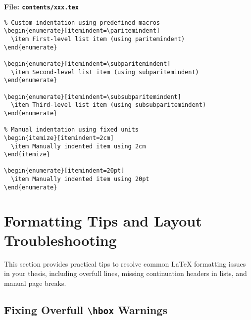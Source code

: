 \noindent\textbf{File: \texttt{contents/xxx.tex}}\vspace{-1em}
\begin{verbatim}
% Custom indentation using predefined macros
\begin{enumerate}[itemindent=\paritemindent]
  \item First-level list item (using paritemindent)
\end{enumerate}

\begin{enumerate}[itemindent=\subparitemindent]
  \item Second-level list item (using subparitemindent)
\end{enumerate}

\begin{enumerate}[itemindent=\subsubparitemindent]
  \item Third-level list item (using subsubparitemindent)
\end{enumerate}

% Manual indentation using fixed units
\begin{itemize}[itemindent=2cm]
  \item Manually indented item using 2cm
\end{itemize}

\begin{enumerate}[itemindent=20pt]
  \item Manually indented item using 20pt
\end{enumerate}
\end{verbatim}



\section{Formatting Tips and Layout Troubleshooting}

\begin{paragraph}
This section provides practical tips to resolve common LaTeX formatting issues in your thesis, including overfull lines, missing continuation headers in lists, and manual page breaks.
\end{paragraph}

\subsection{Fixing Overfull \texttt{\textbackslash hbox} Warnings}
\label{ch3:overflow-fix}

